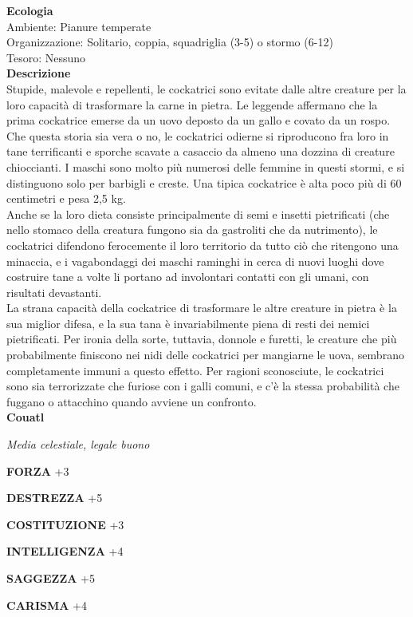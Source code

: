 \begin{multicols}{2}
\textbf{Ecologia}\\
Ambiente: Pianure temperate\\
Organizzazione: Solitario, coppia, squadriglia (3-5) o stormo (6-12)\\
Tesoro: Nessuno\\
\textbf{Descrizione}\\
Stupide, malevole e repellenti, le cockatrici sono evitate dalle altre creature per la loro capacità di trasformare la carne in pietra. Le leggende affermano che la prima cockatrice emerse da un uovo deposto da un gallo e covato da un rospo. Che questa storia sia vera o no, le cockatrici odierne si riproducono fra loro in tane terrificanti e sporche scavate a casaccio da almeno una dozzina di creature chioccianti. I maschi sono molto più numerosi delle femmine in questi stormi, e si distinguono solo per barbigli e creste. Una tipica cockatrice è alta poco più di 60 centimetri e pesa 2,5 kg.\\
Anche se la loro dieta consiste principalmente di semi e insetti pietrificati (che nello stomaco della creatura fungono sia da gastroliti che da nutrimento), le cockatrici difendono ferocemente il loro territorio da tutto ciò che ritengono una minaccia, e i vagabondaggi dei maschi raminghi in cerca di nuovi luoghi dove costruire tane a volte li portano ad involontari contatti con gli umani, con risultati devastanti.\\
La strana capacità della cockatrice di trasformare le altre creature in pietra è la sua miglior difesa, e la sua tana è invariabilmente piena di resti dei nemici pietrificati. Per ironia della sorte, tuttavia, donnole e furetti, le creature che più probabilmente finiscono nei nidi delle cockatrici per mangiarne le uova, sembrano completamente immuni a questo effetto. Per ragioni sconosciute, le cockatrici sono sia terrorizzate che furiose con i galli comuni, e c'è la stessa probabilità che fuggano o attacchino quando avviene un confronto.\\


\medskip{}\textbf{Couatl}

\emph{Media celestiale, legale buono}

\textbf{FORZA} +3

\textbf{DESTREZZA} +5

\textbf{COSTITUZIONE} +3

\textbf{INTELLIGENZA} +4

\textbf{SAGGEZZA} +5

\textbf{CARISMA} +4


\end{multicols}
